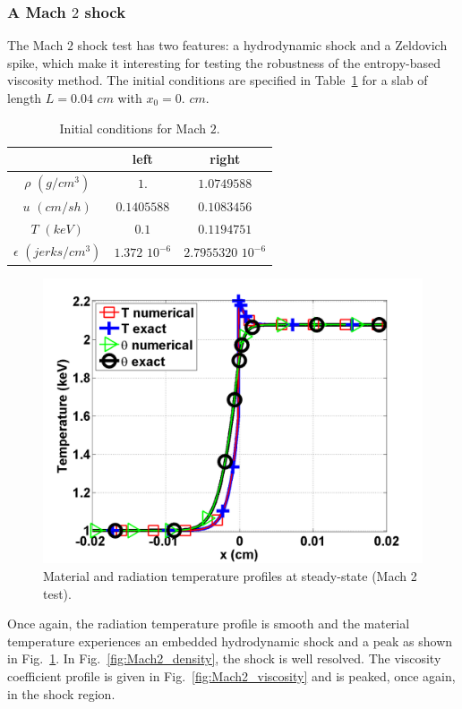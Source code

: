 \documentclass[review]{elsarticle}
\newcommand{\fig}[1]{Fig.~\ref{#1}}                      %
\newcommand{\tbl}[1]{Table~\ref{#1}}                     %
\begin{document}
\subsubsection{A Mach $2$ shock}

The Mach $2$ shock test has two features: a hydrodynamic shock and a Zeldovich spike, which make it interesting for testing the robustness of the entropy-based viscosity method. The initial conditions are specified in \tbl{tbl:table5} for a slab of length $L=0.04$ $cm$ with $x_0 = 0.$ $cm$.
\begin{table}[H]
\caption{\label{tbl:table5} Initial conditions for Mach $2$.}
\begin{center}
\begin{tabular}{|c|c|c|}
\hline 
 & left  & right \\ \hline
$\rho$ $(g/cm^3)$ &$1.$ & $1.0749588$ \\ \hline
$u$ $(cm/sh)$& $0.1405588$ & $0.1083456$ \\ \hline
$T$ $(keV)$& $0.1$ & $0.1194751$\\ \hline
$\epsilon$ $(jerks/cm^3)$ & $1.372$ $10^{-6}$ & $2.7955320$ $10^{-6}$\\
\hline
\end{tabular}  
\end{center}  
\end{table}
\begin{figure}[H]
                \centering
                \includegraphics[width=\textwidth]{figs/Mach_2_nel_2000_temperature.png}
        \caption{Material and radiation temperature profiles at steady-state (Mach 2 test).}\label{fig:Mach2_temp}
\end{figure}
Once again, the radiation temperature profile is smooth and the material temperature experiences an embedded hydrodynamic shock and a peak as shown in \fig{fig:Mach2_temp}. In \fig{fig:Mach2_density}, the shock is well resolved. The viscosity coefficient profile is given in \fig{fig:Mach2_viscosity} and is peaked, once again, in the shock region. 
\end{document}
